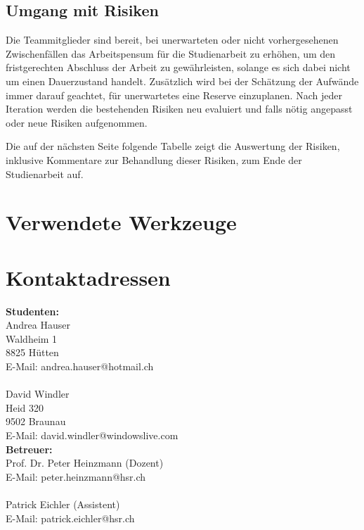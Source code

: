 \documentclass[12pt, a4paper]{report}
\begin{document}
	\section{Umgang mit Risiken}
	Die Teammitglieder sind bereit, bei unerwarteten oder nicht vorhergesehenen Zwischenfällen das Arbeitspensum für die Studienarbeit zu erhöhen, um den fristgerechten Abschluss der Arbeit zu gewährleisten, solange es sich dabei nicht um einen Dauerzustand handelt. Zusätzlich wird bei der Schätzung der Aufwände immer darauf geachtet, für unerwartetes eine Reserve einzuplanen.
	Nach jeder Iteration werden die bestehenden Risiken neu evaluiert und falls nötig angepasst oder neue Risiken aufgenommen.
	
	Die auf der nächsten Seite folgende Tabelle zeigt die Auswertung der Risiken, inklusive Kommentare zur Behandlung dieser Risiken, zum Ende der Studienarbeit auf.
	
	 

	\chapter{Verwendete Werkzeuge}
	\label{chap:werkzeuge}
	
	
	
	\chapter{Kontaktadressen}
	\label{LastPage}
	\begin{multicols}{2}
	\noindent \textbf{Studenten:}
	\\
	Andrea Hauser\\
	Waldheim 1\\
	8825 Hütten\\
	E-Mail: andrea.hauser@hotmail.ch\\
	\\
	David Windler\\
	Heid 320\\
	9502 Braunau\\
	\columnbreak
	E-Mail: david.windler@windowslive.com\\
	\textbf{Betreuer:}\\
	Prof. Dr. Peter Heinzmann (Dozent)\\
	E-Mail: peter.heinzmann@hsr.ch\\
	\\
	Patrick Eichler (Assistent)\\
	E-Mail: patrick.eichler@hsr.ch\\
	
	\end{multicols}
	
	

	
	
	
\end{document}
